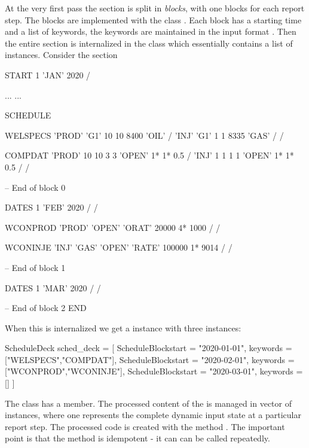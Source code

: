 At the very first pass the  section is split in \emph{blocks}, with
one blocks for each report step. The blocks are implemented with the class
. Each block has a starting time and a list of
keywords, the keywords are maintained in the input format
. Then the entire  section is internalized
in the class  which essentially contains a list of
 instances. Consider the  section
\begin{deck}
START
  1 'JAN' 2020 /

...
...

SCHEDULE

WELSPECS
	'PROD'	'G1'	10	10	8400	'OIL' /
	'INJ'	'G1'	1	1	8335	'GAS' /
/

COMPDAT
	'PROD'	10	10	3	3	'OPEN'	1*	1*	0.5 /
	'INJ'	1	1	1	1	'OPEN'	1*	1*	0.5 /
/

-- End of block 0

DATES
   1 'FEB' 2020 /
/

WCONPROD
	'PROD' 'OPEN' 'ORAT' 20000 4* 1000 /
/

WCONINJE
	'INJ'	'GAS'	'OPEN'	'RATE'	100000 1* 9014 /
/

-- End of block 1

DATES
  1 'MAR' 2020 /
/

-- End of block 2
END

\end{deck}

When this is internalized we get a  instance with three
 instances:

\begin{code}
ScheduleDeck sched_deck = [
  ScheduleBlock{start = "2020-01-01", keywords = ["WELSPECS","COMPDAT"]},
  ScheduleBlock{start = "2020-02-01", keywords = ["WCONPROD","WCONINJE"]},
  ScheduleBlock{start = "2020-03-01", keywords = []}
]
\end{code}

The  class has a  member. The
processed content of the  is managed in vector of
 instances, where one 
represents the complete dynamic input state at a particular report step. The
processed  code is created with the method
. The important point is that the
 method is idempotent - it can can
be called repeatedly.


